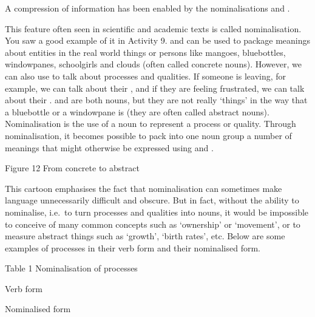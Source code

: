 \documentclass[letterpaper,10pt,english]{sphinxmanual}
\let\sphinxpxdimen\pdfpxdimen\else\newdimen\sphinxpxdimen
\begin{document}
A compression of information has been enabled by the nominalisations  and .

This feature often seen in scientific and academic texts is called nominalisation. You saw a good example of it in Activity 9.  and  can be used to package meanings about entities in the real world \textendash{} things or persons like mangoes, bluebottles, windowpanes, schoolgirls and clouds (often called concrete nouns). However, we can also use  to talk about processes and qualities. If someone is leaving, for example, we can talk about their , and if they
are feeling frustrated, we can talk about their .  and  are both nouns, but they are not really ‘things’ in the way that a bluebottle or a windowpane is (they are often called abstract nouns). Nominalisation is the use of a noun to represent a process or quality. Through nominalisation, it becomes possible to pack into one noun group a number of meanings that might otherwise be expressed using  and .

\sphinxincludegraphics[width=342\sphinxpxdimen,height=312\sphinxpxdimen]{{e304_bk3_ch1_fig013.tif}.jpg}

Figure 12 From concrete to abstract

This cartoon emphasises the fact that nominalisation can sometimes make language unnecessarily difficult and obscure. But in fact, without the ability to nominalise, i.e. to turn processes and qualities into nouns, it would be impossible to conceive of many common concepts such as ‘ownership’ or ‘movement’, or to measure abstract things such as ‘growth’, ‘birth rates’, etc. Below are some examples of processes in their verb form and their nominalised form.





Table 1 Nominalisation of processes









Verb form





Nominalised form
\end{document}
